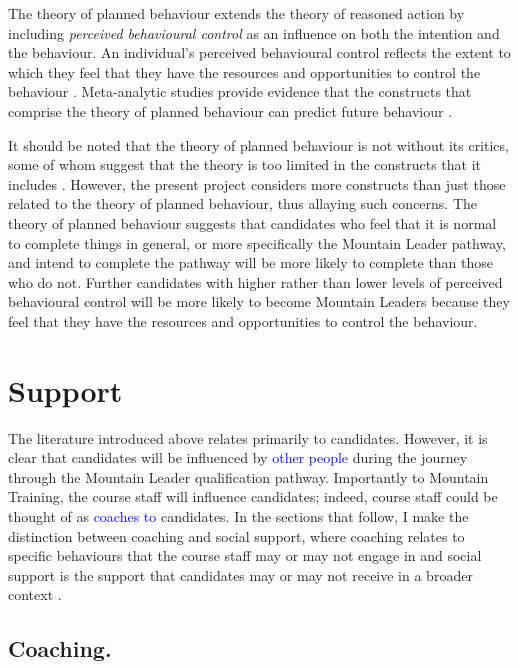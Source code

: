 \documentclass[
  12pt,
  a4paper,
]{book}
\begin{document}
The theory of planned behaviour extends the theory of reasoned action by including \emph{perceived behavioural control} as an influence on both the intention and the behaviour. An individual's perceived behavioural control reflects the extent to which they feel that they have the resources and opportunities to control the behaviour \citep[n.b.,][ suggested that perceived behavioural control is similar to the construct of self-efficacy]{Ajzen1991}. Meta-analytic studies provide evidence that the constructs that comprise the theory of planned behaviour can predict future behaviour \citep{Armitage2001, Hagger2002}.

It should be noted that the theory of planned behaviour is not without its critics, some of whom suggest that the theory is too limited in the constructs that it includes \citep[cf.~][]{Sniehotta2014}. However, the present project considers more constructs than just those related to the theory of planned behaviour, thus allaying such concerns. The theory of planned behaviour suggests that candidates who feel that it is normal to complete things in general, or more specifically the Mountain Leader pathway, and intend to complete the pathway will be more likely to complete than those who do not. Further candidates with higher rather than lower levels of perceived behavioural control will be more likely to become Mountain Leaders because they feel that they have the resources and opportunities to control the behaviour.

\hypertarget{gen-intro-support}{%
\section{Support}\label{gen-intro-support}}

The literature introduced above relates primarily to candidates. However, it is clear that candidates will be influenced by \textcolor{blue}{other people} during the journey through the Mountain Leader qualification pathway. Importantly to Mountain Training, the course staff will influence candidates; indeed, course staff could be thought of as \textcolor{blue}{coaches to} candidates. In the sections that follow, I make the distinction between coaching and social support, where coaching relates to specific behaviours that the course staff may or may not engage in \citep{Wagstaff2018} and social support is the support that candidates may or may not receive in a broader context \citep{Cutrona1990a}.

\hypertarget{gen-intro-social-coaching}{%
\subsection{Coaching.}\label{gen-intro-social-coaching}}
\end{document}
